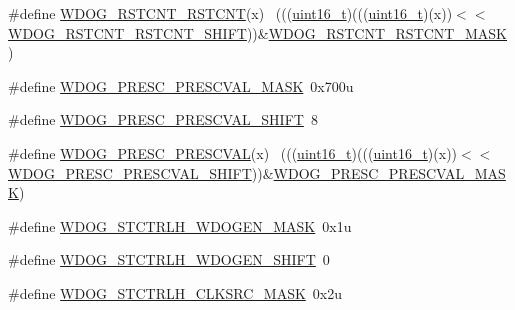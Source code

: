 \begin{DoxyCompactItemize}
\item 
\#define \hyperlink{group___w_d_o_g___register___masks_gac501c4fad4e6a5710c4db132f5d67d94}{W\+D\+O\+G\+\_\+\+R\+S\+T\+C\+N\+T\+\_\+\+R\+S\+T\+C\+NT}(x)                                    ~(((\hyperlink{_p_e___types_8h_a1f1825b69244eb3ad2c7165ddc99c956}{uint16\+\_\+t})(((\hyperlink{_p_e___types_8h_a1f1825b69244eb3ad2c7165ddc99c956}{uint16\+\_\+t})(x))$<$$<$\hyperlink{group___w_d_o_g___register___masks_gaf2ecbd74ca7b1ba60bc7b89de17b97a6}{W\+D\+O\+G\+\_\+\+R\+S\+T\+C\+N\+T\+\_\+\+R\+S\+T\+C\+N\+T\+\_\+\+S\+H\+I\+FT}))\&\hyperlink{group___w_d_o_g___register___masks_ga1cb55a509947b315d216ed9d822a4967}{W\+D\+O\+G\+\_\+\+R\+S\+T\+C\+N\+T\+\_\+\+R\+S\+T\+C\+N\+T\+\_\+\+M\+A\+SK})
\item 
\#define \hyperlink{group___w_d_o_g___register___masks_gaeadae4c65653a3302e69526730af1596}{W\+D\+O\+G\+\_\+\+P\+R\+E\+S\+C\+\_\+\+P\+R\+E\+S\+C\+V\+A\+L\+\_\+\+M\+A\+SK}~0x700u
\item 
\#define \hyperlink{group___w_d_o_g___register___masks_gaa93b6acb20a8e20b687f05b8ced452c1}{W\+D\+O\+G\+\_\+\+P\+R\+E\+S\+C\+\_\+\+P\+R\+E\+S\+C\+V\+A\+L\+\_\+\+S\+H\+I\+FT}~8
\item 
\#define \hyperlink{group___w_d_o_g___register___masks_ga12a4ea6a8119ee62c26559f27423996f}{W\+D\+O\+G\+\_\+\+P\+R\+E\+S\+C\+\_\+\+P\+R\+E\+S\+C\+V\+AL}(x)                                  ~(((\hyperlink{_p_e___types_8h_a1f1825b69244eb3ad2c7165ddc99c956}{uint16\+\_\+t})(((\hyperlink{_p_e___types_8h_a1f1825b69244eb3ad2c7165ddc99c956}{uint16\+\_\+t})(x))$<$$<$\hyperlink{group___w_d_o_g___register___masks_gaa93b6acb20a8e20b687f05b8ced452c1}{W\+D\+O\+G\+\_\+\+P\+R\+E\+S\+C\+\_\+\+P\+R\+E\+S\+C\+V\+A\+L\+\_\+\+S\+H\+I\+FT}))\&\hyperlink{group___w_d_o_g___register___masks_gaeadae4c65653a3302e69526730af1596}{W\+D\+O\+G\+\_\+\+P\+R\+E\+S\+C\+\_\+\+P\+R\+E\+S\+C\+V\+A\+L\+\_\+\+M\+A\+SK})
\item 
\#define \hyperlink{group___w_d_o_g___register___masks_ga4ca33884d6a6fed2670ba04150fbff3a}{W\+D\+O\+G\+\_\+\+S\+T\+C\+T\+R\+L\+H\+\_\+\+W\+D\+O\+G\+E\+N\+\_\+\+M\+A\+SK}~0x1u
\item 
\#define \hyperlink{group___w_d_o_g___register___masks_ga7d9c369fd8fe12905d3e4b2d94bfe9be}{W\+D\+O\+G\+\_\+\+S\+T\+C\+T\+R\+L\+H\+\_\+\+W\+D\+O\+G\+E\+N\+\_\+\+S\+H\+I\+FT}~0
\item 
\#define \hyperlink{group___w_d_o_g___register___masks_gaf3ab71b185905c077887baa062ad6664}{W\+D\+O\+G\+\_\+\+S\+T\+C\+T\+R\+L\+H\+\_\+\+C\+L\+K\+S\+R\+C\+\_\+\+M\+A\+SK}~0x2u
\item 

\end{DoxyCompactItemize}
